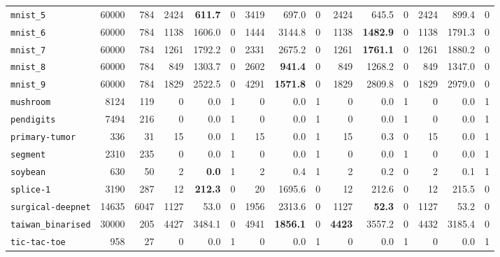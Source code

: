 \begin{tabular}{lccrrrrrrrrrrrr}
\texttt{mnist\_5} & \multicolumn{1}{r}{60000} & \multicolumn{1}{r}{784}  & 2424 & \textbf{611.7} & 0 & 3419 & 697.0 & 0 & 2424 & 645.5 & 0 & 2424 & 899.4 & 0\\
\texttt{mnist\_6} & \multicolumn{1}{r}{60000} & \multicolumn{1}{r}{784}  & 1138 & 1606.0 & 0 & 1444 & 3144.8 & 0 & 1138 & \textbf{1482.9} & 0 & 1138 & 1791.3 & 0\\
\texttt{mnist\_7} & \multicolumn{1}{r}{60000} & \multicolumn{1}{r}{784}  & 1261 & 1792.2 & 0 & 2331 & 2675.2 & 0 & 1261 & \textbf{1761.1} & 0 & 1261 & 1880.2 & 0\\
\texttt{mnist\_8} & \multicolumn{1}{r}{60000} & \multicolumn{1}{r}{784}  & 849 & 1303.7 & 0 & 2602 & \textbf{941.4} & 0 & 849 & 1268.2 & 0 & 849 & 1347.0 & 0\\
\texttt{mnist\_9} & \multicolumn{1}{r}{60000} & \multicolumn{1}{r}{784}  & 1829 & 2522.5 & 0 & 4291 & \textbf{1571.8} & 0 & 1829 & 2809.8 & 0 & 1829 & 2979.0 & 0\\
\texttt{mushroom} & \multicolumn{1}{r}{8124} & \multicolumn{1}{r}{119}  & 0 & 0.0 & 1 & 0 & 0.0 & 1 & 0 & 0.0 & 1 & 0 & 0.0 & 1\\
\texttt{pendigits} & \multicolumn{1}{r}{7494} & \multicolumn{1}{r}{216}  & 0 & 0.0 & 1 & 0 & 0.0 & 1 & 0 & 0.0 & 1 & 0 & 0.0 & 1\\
\texttt{primary-tumor} & \multicolumn{1}{r}{336} & \multicolumn{1}{r}{31}  & 15 & 0.0 & 1 & 15 & 0.0 & 1 & 15 & 0.3 & 0 & 15 & 0.0 & 1\\
\texttt{segment} & \multicolumn{1}{r}{2310} & \multicolumn{1}{r}{235}  & 0 & 0.0 & 1 & 0 & 0.0 & 1 & 0 & 0.0 & 1 & 0 & 0.0 & 1\\
\texttt{soybean} & \multicolumn{1}{r}{630} & \multicolumn{1}{r}{50}  & 2 & \textbf{0.0} & 1 & 2 & 0.4 & 1 & 2 & 0.2 & 0 & 2 & 0.1 & 1\\
\texttt{splice-1} & \multicolumn{1}{r}{3190} & \multicolumn{1}{r}{287}  & 12 & \textbf{212.3} & 0 & 20 & 1695.6 & 0 & 12 & 212.6 & 0 & 12 & 215.5 & 0\\
\texttt{surgical-deepnet} & \multicolumn{1}{r}{14635} & \multicolumn{1}{r}{6047}  & 1127 & 53.0 & 0 & 1956 & 2313.6 & 0 & 1127 & \textbf{52.3} & 0 & 1127 & 53.2 & 0\\
\texttt{taiwan\_binarised} & \multicolumn{1}{r}{30000} & \multicolumn{1}{r}{205}  & 4427 & 3484.1 & 0 & 4941 & \textbf{1856.1} & 0 & \textbf{4423} & 3557.2 & 0 & 4432 & 3185.4 & 0\\
\texttt{tic-tac-toe} & \multicolumn{1}{r}{958} & \multicolumn{1}{r}{27}  & 0 & 0.0 & 1 & 0 & 0.0 & 1 & 0 & 0.0 & 1 & 0 & 0.0 & 1\\

\end{tabular}
